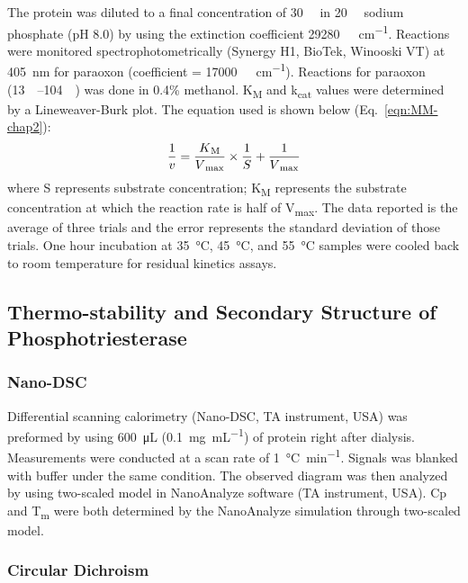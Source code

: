 \begin{refsection}
The protein was diluted to a final concentration of \SI{30}{\nano\Molar} in
\SI{20}{\milli\Molar} sodium phosphate (pH 8.0) by using the extinction
coefficient \SI{29280}{\per\Molar\per\cm}. Reactions were monitored
spectrophotometrically (Synergy H1, BioTek, Winooski VT) at \SI{405}{\nm} for
paraoxon (coefficient = \SI{17000}{\per\Molar\per\cm}).  Reactions for paraoxon
(\SIrange{13}{104}{\micro\Molar}) was done in 0.4\% methanol.
K\textsubscript{M} and k\textsubscript{cat} values were determined by a
Lineweaver-Burk plot.\cite{Baker2011b} The equation used is shown below
(Eq.~\ref{eqn:MM-chap2}): 
\begin{equation} 
    \frac{1}{v} =
    \frac{K\textsubscript{M}}{V\textsubscript{max}}\times\frac{1}{S} +
    \frac{1}{V\textsubscript{max}} 
    \label{eqn:MM-chap2}
\end{equation}
where S represents substrate concentration; K\textsubscript{M} represents the
substrate concentration at which the reaction rate is half of
V\textsubscript{max}. The data reported is the average of three trials and the
error represents the standard deviation of those trials. One hour incubation at
\SI{35}{\celsius}, \SI{45}{\celsius}, and \SI{55}{\celsius} samples were cooled
back to room temperature for residual kinetics assays. 

\subsection{Thermo-stability and Secondary Structure of Phosphotriesterase}

\subsubsection{Nano-DSC}

Differential scanning calorimetry (Nano-DSC, TA instrument, USA) was preformed
by using \SI{600}{\micro\L} (\SI{0.1}{\mg\per\mL}) of protein right after
dialysis. Measurements were conducted at a scan rate of
\SI{1}{\celsius\per\minute}. Signals was blanked with buffer under
the same condition.  The observed diagram was then analyzed by using
two-scaled model in NanoAnalyze software (TA instrument, USA). Cp and
T\textsubscript{m} were both determined by the NanoAnalyze simulation through
two-scaled model.

\subsubsection{Circular Dichroism}


\end{refsection}
